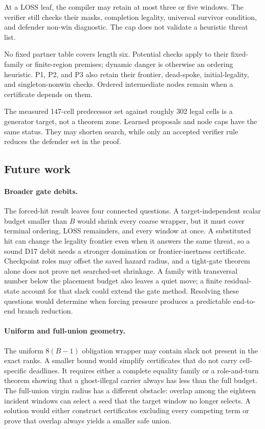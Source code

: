 At a LOSS leaf, the compiler may retain at most three or five windows.  The
verifier still checks their masks, completion legality, universal survivor
condition, and defender non-win diagnostic.  The cap does not validate a
heuristic threat list.

No fixed partner table covers length six.  Potential checks apply to their
fixed-family or finite-region premises; dynamic danger is otherwise an
ordering heuristic.  P1, P2, and P3 also retain their frontier, dead-spoke,
initial-legality, and singleton-nonwin checks.  Ordered intermediate nodes
remain when a certificate depends on them.

The measured 147-cell predecessor set against roughly 302 legal cells is a
generator target, not a theorem zone.  Learned proposals and node caps have
the same status.  They may shorten search, while only an accepted verifier
rule reduces the defender set in the proof.

\subsection{Future work}

\paragraph{Broader gate debits.}
The forced-hit result leaves four connected questions.  A target-independent
scalar budget smaller than $B$ would shrink every coarse wrapper, but it must
cover terminal ordering, LOSS remainders, and every window at once.  A
substituted hit can change the legality frontier even when it answers the same
threat, so a sound D17 debit needs a stronger domination or frontier-inertness
certificate.  Checkpoint roles may offset the saved hazard radius, and a
tight-gate theorem alone does not prove net searched-set shrinkage.  A family
with transversal number below the placement budget also leaves a quiet move;
a finite residual-state account for that slack could extend the gate method.
Resolving these questions would determine when forcing pressure produces a
predictable end-to-end branch reduction.

\paragraph{Uniform and full-union geometry.}
The uniform $8(B-1)$ obligation wrapper may contain slack not present in the
exact ranks.  A smaller bound would simplify certificates that do not carry
cell-specific deadlines.  It requires either a complete equality family or a
role-and-turn theorem showing that a ghost-illegal carrier always has less
than the full budget.  The full-union virgin radius has a different obstacle:
overlap among the eighteen incident windows can select a seed that the target
window no longer selects.  A solution would either construct certificates
excluding every competing term or prove that overlap always yields a smaller
safe union.

